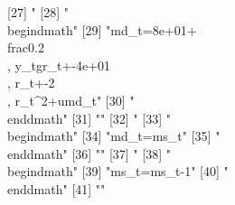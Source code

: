 [27] "%
[28] "\\begin{dmath}"                                                                                                                                       
[29] "{md_{t}}=8e+01+\\frac{0.2\\, {y_{t}}}{{gr_{t}}}+-4e+01\\, {r_{t}}+-2\\, {r_{t}}^{2}+{umd_{t}}"                                                        
[30] "\\end{dmath}"                                                                                                                                         
[31] ""                                                                                                                                                     
[32] "%
[33] "\\begin{dmath}"                                                                                                                                       
[34] "{md_{t}}={ms_{t}}"                                                                                                                                    
[35] "\\end{dmath}"                                                                                                                                         
[36] ""                                                                                                                                                     
[37] "%
[38] "\\begin{dmath}"                                                                                                                                       
[39] "{ms_{t}}={ms_{t-1}}"                                                                                                                                  
[40] "\\end{dmath}"                                                                                                                                         
[41] ""                                                                                                                                                     
